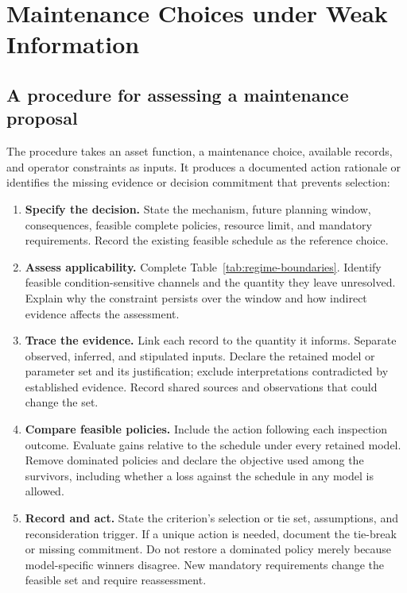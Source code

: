 \documentclass[symmetry,article,submit,pdftex,oneauthor]{Definitions/mdpi}
\begin{document}
\section{Maintenance Choices under Weak Information}
\label{sec:decisions}

\subsection{A procedure for assessing a maintenance proposal}
\label{sec:procedure}

The procedure takes an asset function, a maintenance choice, available records, and operator constraints as inputs. It produces a documented action rationale or identifies the missing evidence or decision commitment that prevents selection:
\begin{enumerate}[label=\arabic*.,leftmargin=1.5em]
\item \textbf{Specify the decision.} State the mechanism, future planning window, consequences, feasible complete policies, resource limit, and mandatory requirements. Record the existing feasible schedule as the reference choice.
\item \textbf{Assess applicability.} Complete Table~\ref{tab:regime-boundaries}. Identify feasible condition-sensitive channels and the quantity they leave unresolved. Explain why the constraint persists over the window and how indirect evidence affects the assessment.
\item \textbf{Trace the evidence.} Link each record to the quantity it informs. Separate observed, inferred, and stipulated inputs. Declare the retained model or parameter set and its justification; exclude interpretations contradicted by established evidence. Record shared sources and observations that could change the set.
\item \textbf{Compare feasible policies.} Include the action following each inspection outcome. Evaluate gains relative to the schedule under every retained model. Remove dominated policies and declare the objective used among the survivors, including whether a loss against the schedule in any model is allowed.
\item \textbf{Record and act.} State the criterion's selection or tie set, assumptions, and reconsideration trigger. If a unique action is needed, document the tie-break or missing commitment. Do not restore a dominated policy merely because model-specific winners disagree. New mandatory requirements change the feasible set and require reassessment.
\end{enumerate}
\end{document}
